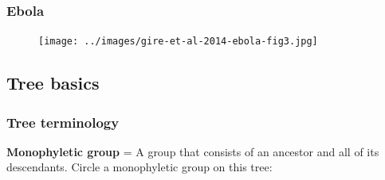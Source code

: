 
\begin{frame}
    \frametitle{Ebola}
    \begin{adjustwidth}{-1.5em}{-1.5em}
    \begin{figure}
        \begin{center}
        \texttt{[image: ../images/gire-et-al-2014-ebola-fig3.jpg]}
        \caption{\tiny {}}
        \end{center}
    \end{figure}
    \end{adjustwidth}
\end{frame}




\subsection{Tree basics}


\begin{frame}
    \frametitle{Tree terminology}

        

\end{frame}



\begin{noheadline}
\begin{frame}
    \begin{adjustwidth}{-1.5em}{-1.5em}
    \textbf{Monophyletic group} =  A group that consists of an ancestor and all
    of its descendants. Circle a monophyletic group on this tree:

    \begin{center}
        
    \end{center}

    \end{adjustwidth}
\end{frame}
\end{noheadline}


